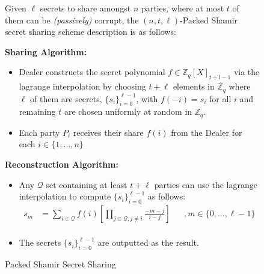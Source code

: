 \begin{figure}[ht]
    \centering
    \begin{tcolorbox}[title=\textbf{Packed Shamir Secret Sharing}, width=0.9\textwidth, colframe=blue!75!black, colback=blue!10, sharp corners]
        Given $\ell$ secrets to share amongst $n$ parties, where at most $t$ of them can
        be \textit{(passively)} corrupt, the $(n,t,\ell)$-Packed Shamir secret sharing scheme description is as
        follows:
        
        \vspace{0.5em}
        \textbf{Sharing Algorithm:}
        \begin{itemize}
            \item Dealer constructs the secret polynomial $f\in\mathbb{Z}_q[X]_{t+l-1}$
                  via the lagrange interpolation by choosing $t+\ell$ elements in 
                  $\mathbb{Z}_q$ where $\ell$ of them are secrets, $\{s_i\}_{i=0}^{\ell-1}$, with
                  $f(-i)=s_i$ for all $i$ and remaining $t$ are chosen uniformly 
                  at random in $\mathbb{Z}_q$.
            \item Each party $P_i$ receives their share $f(i)$ from the Dealer
                  for each $i\in\{1,\dots,n\}$
        \end{itemize}
        
        \vspace{0.5em}
        \textbf{Reconstruction Algorithm:}
        \begin{itemize}
            \item Any $\mathcal{Q}$ set containing at least $t+\ell$ parties can use the 
            lagrange interpolation to compute $\{s_i\}_{i=0}^{\ell-1}$ as follows:
            \begin{align*}
                s_m &= \sum_{i\in \mathcal{Q}} f(i) \left[\prod_{j\in \mathcal{Q}, j\neq i}\frac{-m-j}{i-j}\right] &&, m\in\{0,\dots,\ell-1\} \\
            \end{align*}
            \item The secrets $\{s_i\}_{i=0}^{\ell-1}$ are outputted as the result.
        \end{itemize}
    \end{tcolorbox}
    \caption{Packed Shamir Secret Sharing}
    \label{fig:packed-shamir}
\end{figure}
